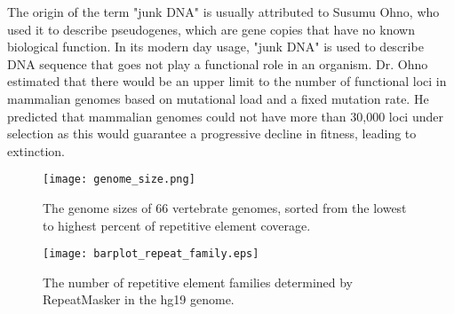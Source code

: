 The origin of the term "junk DNA" is usually attributed to Susumu Ohno, who used it to describe pseudogenes, which are gene copies that have no known biological function. In its modern day usage, "junk DNA" is used to describe DNA sequence that goes not play a functional role in an organism. Dr. Ohno estimated that there would be an upper limit to the number of functional loci in mammalian genomes based on mutational load and a fixed mutation rate. He predicted that mammalian genomes could not have more than 30,000 loci under selection as this would guarantee a progressive decline in fitness, leading to extinction.

\begin{figure}[h]
   \centering
   \texttt{[image: genome\_size.png]}
   \caption[Vertebrate genomes sizes]{The genome sizes of 66 vertebrate genomes, sorted from the lowest to highest percent of repetitive element coverage\cite{tang2014gensize}.}
   \label{fig:genome_size}
\end{figure}

\begin{figure}[h]
   \centering
   \texttt{[image: barplot\_repeat\_family.eps]}
   \caption[Tally of repetitive element families in the hg19 genome]{The number of repetitive element families determined by RepeatMasker in the hg19 genome.}
   \label{fig:repeat_family}
\end{figure}

